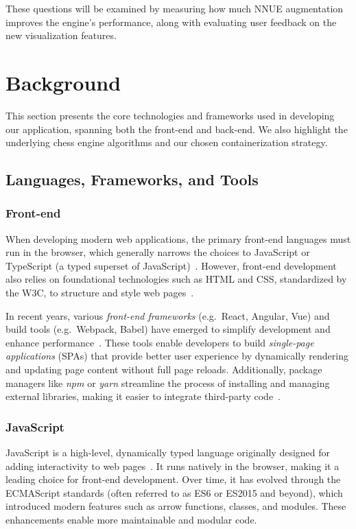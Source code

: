\documentclass[12pt,a4paper]{article}
\begin{document}
These questions will be examined by measuring how much NNUE augmentation
improves the engine’s performance, along with evaluating user feedback on the
new visualization features.

\section{Background}
\label{sec:Background}

This section presents the core technologies and frameworks used in developing our application, spanning both the front-end and back-end. We also highlight the underlying chess engine algorithms and our chosen containerization strategy. 

\subsection{Languages, Frameworks, and Tools}
\subsubsection{Front-end}
When developing modern web applications, the primary front-end languages must run
in the browser, which generally narrows the choices to JavaScript or TypeScript (a typed superset of JavaScript)~\cite{ECMA}. However, front-end development also relies on foundational technologies such as HTML and CSS, standardized by the W3C, to structure and style web pages~\cite{W3C,MDNDocs}. 

In recent years, various \emph{front-end frameworks} (e.g.\ React, Angular, Vue) and build tools (e.g.\ Webpack, Babel) have emerged to simplify development and enhance performance~\cite{webpack,babel}. These tools enable developers to build \emph{single-page applications} (SPAs) that provide better user experience by dynamically rendering and updating page content without full page reloads. Additionally, package managers like \emph{npm} or \emph{yarn} streamline the process of installing and managing external libraries, making it easier to integrate third-party code~\cite{npmDocs,yarnDocs}.

\subsubsection*{JavaScript}
JavaScript is a high-level, dynamically typed language originally designed for adding
interactivity to web pages~\cite{ECMA,JSHistory}. It runs natively in the browser, making it a leading choice for front-end development. Over time, it has evolved through the ECMAScript standards (often referred to as ES6 or ES2015 and beyond), which introduced modern features such as arrow functions, classes, and modules. These enhancements enable more maintainable and modular code.
\end{document}
